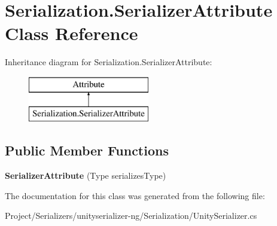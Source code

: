 \hypertarget{class_serialization_1_1_serializer_attribute}{}\section{Serialization.\+Serializer\+Attribute Class Reference}
\label{class_serialization_1_1_serializer_attribute}
Inheritance diagram for Serialization.\+Serializer\+Attribute\+:\begin{figure}[H]
\begin{center}
\leavevmode
\includegraphics[height=2.000000cm]{class_serialization_1_1_serializer_attribute}
\end{center}
\end{figure}
\subsection*{Public Member Functions}
\begin{DoxyCompactItemize}
\item 
\mbox{\label{class_serialization_1_1_serializer_attribute_a475101d279677de97c551398f3f67530}} 
{\bfseries Serializer\+Attribute} (Type serializes\+Type)
\end{DoxyCompactItemize}


The documentation for this class was generated from the following file\+:\begin{DoxyCompactItemize}
\item 
Project/\+Serializers/unityserializer-\/ng/\+Serialization/Unity\+Serializer.\+cs\end{DoxyCompactItemize}
